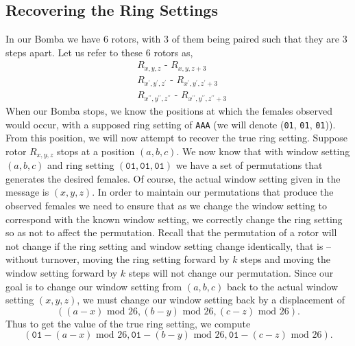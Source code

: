 \subsection{Recovering the Ring Settings}
In our Bomba we have 6 rotors, with 3 of them being paired such that
they are 3 steps apart. Let us refer to these 6 rotors as,
\begin{align*}
  & R_{x,y,z} \texttt{ - } R_{x,y,z+3}
  \\
  & R_{x^\prime,y^\prime,z^\prime} \texttt{ - }
  R_{x^\prime,y^\prime,z^\prime+3}
  \\
  & R_{x^{\prime\prime},y^{\prime\prime},z^{\prime\prime}} \texttt{ -
  } R_{x^{\prime\prime},y^{\prime\prime},z^{\prime\prime}+3}
\end{align*}
When our Bomba stops, we know the positions at which the females
observed would occur, with a supposed ring setting of \texttt{AAA} (we
will denote (\texttt{01}, \texttt{01}, \texttt{01})).
From this position, we will now attempt to recover the true ring
setting. Suppose rotor $R_{x,y,z}$ stops at a position $(a,b,c)$. We
now know that with window setting $(a,b,c)$ and ring setting
$(\texttt{01}, \texttt{01}, \texttt{01})$ we have a set of
permutations that generates the desired females. Of course, the
actual window setting given in the message is $(x,y,z)$. In order to
maintain our permutations that produce the observed females we need
to ensure that as we change the window setting to correspond with the
known window setting, we correctly change the ring setting so as not
to affect the permutation. Recall that the permutation of a rotor
will not change if the ring setting and window setting change
identically, that is -- without turnover, moving the ring setting
forward by $k$ steps and moving the window setting forward by $k$
steps will not change our permutation. Since our goal is to change
our window setting from $(a,b,c)$ back to the actual window setting
$(x,y,z)$, we must change our window setting back by a displacement of
\[
  ((a-x)\text{ mod } 26, (b-y)\text{ mod }26, (c-z)\text{ mod }26).
\]
Thus to get the value of the true ring setting, we compute
\[
  (\texttt{01} - (a- x)\text{ mod }26, \texttt{01} - (b- y)\text{ mod
    }26, \texttt{01} - (c-
  z)\text{ mod }26).
\]

